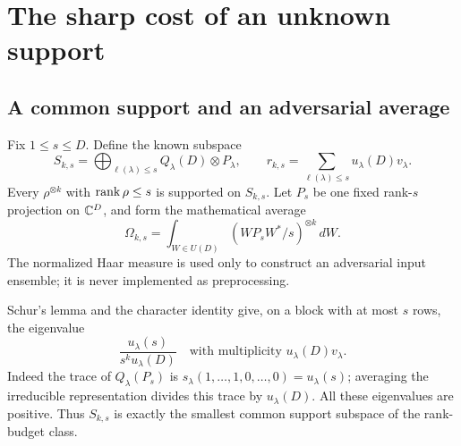 \section{The sharp cost of an unknown support}\label{sec:support}

\subsection{A common support and an adversarial average}
Fix $1\le s\le D$. Define the known subspace
\begin{equation}\label{eq:rank-support}
 S_{k,s}=\bigoplus_{\ell(\lambda)\le s}Q_\lambda(D)\otimes P_\lambda,
 \qquad r_{k,s}=\sum_{\ell(\lambda)\le s}u_\lambda(D)v_\lambda.
\end{equation}
Every $\rho^{\otimes k}$ with $\operatorname{rank}\rho\le s$ is supported on $S_{k,s}$. Let $P_s$ be one fixed rank-$s$ projection on $\mathbb C^D$, and form the mathematical average
\begin{equation}\label{eq:haar-average}
 \Omega_{k,s}=\int_{W\in U(D)}(WP_sW^*/s)^{\otimes k}\,dW.
\end{equation}
The normalized Haar measure is used only to construct an adversarial input ensemble; it is never implemented as preprocessing.

Schur's lemma and the character identity give, on a block with at most $s$ rows, the eigenvalue
\begin{equation}\label{eq:average-eigenvalues}
 \frac{u_\lambda(s)}{s^ku_\lambda(D)}
 \quad\text{with multiplicity }u_\lambda(D)v_\lambda.
\end{equation}
Indeed the trace of $Q_\lambda(P_s)$ is $s_\lambda(1,\ldots,1,0,\ldots,0)=u_\lambda(s)$; averaging the irreducible representation divides this trace by $u_\lambda(D)$. All these eigenvalues are positive. Thus $S_{k,s}$ is exactly the smallest common support subspace of the rank-budget class.

